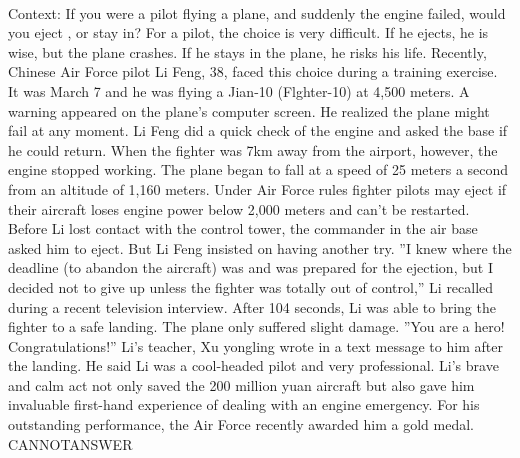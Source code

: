 \documentclass[11pt,a4paper, onecolumn]{article}
\begin{document}
\\ Context: If you were a pilot flying a plane, and suddenly the engine failed, would you eject , or stay in? For a pilot, the choice is very difficult. If he ejects, he is wise, but the plane crashes. If he stays in the plane, he risks his life. Recently, Chinese Air Force pilot Li Feng, 38, faced this choice during a training exercise. It was March 7 and he was flying a Jian-10 (Flghter-10) at 4,500 meters. A warning appeared on the plane's computer screen. He realized the plane might fail at any moment. Li Feng did a quick check of the engine and asked the base if he could return. When the fighter was 7km away from the airport, however, the engine stopped working. The plane began to fall at a speed of 25 meters a second from an altitude of 1,160 meters. Under Air Force rules fighter pilots may eject if their aircraft loses engine power below 2,000 meters and can't be restarted. Before Li lost contact with the control tower, the commander in the air base asked him to eject. But Li Feng insisted on having another try. ''I knew where the deadline (to abandon the aircraft) was and was prepared for the ejection, but I decided not to give up unless the fighter was totally out of control,'' Li recalled during a recent television interview. After 104 seconds, Li was able to bring the fighter to a safe landing. The plane only suffered slight damage. ''You are a hero! Congratulations!'' Li's teacher, Xu yongling wrote in a text message to him after the landing. He said Li was a cool-headed pilot and very professional. Li's brave and calm act not only saved the 200 million yuan aircraft but also gave him invaluable first-hand experience of dealing with an engine emergency. For his outstanding performance, the Air Force recently awarded him a gold medal. CANNOTANSWER
\end{document}
